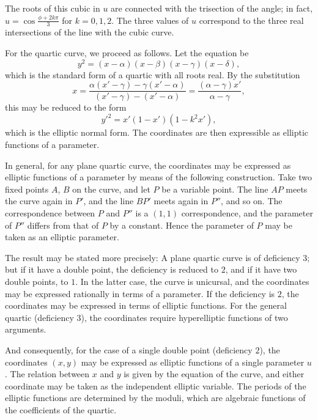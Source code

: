 \documentclass[11pt,a4paper]{book}
\begin{document}
\begin{art}
The roots of this cubic in $u$ are connected with the trisection of the angle; in fact, $u = \cos\frac{\phi + 2k\pi}{3}$ for $k = 0, 1, 2$. The three values of $u$ correspond to the three real intersections of the line with the cubic curve.
\end{art}

\begin{art}
For the quartic curve, we proceed as follows. Let the equation be
\[
y^2 = (x - \alpha)(x - \beta)(x - \gamma)(x - \delta),
\]
which is the standard form of a quartic with all roots real. By the substitution
\[
x = \frac{\alpha(x' - \gamma) - \gamma(x' - \alpha)}{(x' - \gamma) - (x' - \alpha)}
= \frac{(\alpha - \gamma)x'}{\alpha - \gamma},
\]
this may be reduced to the form
\[
y'^2 = x'(1 - x')(1 - k^2x'),
\]
which is the elliptic normal form. The coordinates are then expressible as elliptic functions of a parameter.
\end{art}

\begin{art}
In general, for any plane quartic curve, the coordinates may be expressed as elliptic functions of a parameter by means of the following construction. Take two fixed points $A$, $B$ on the curve, and let $P$ be a variable point. The line $AP$ meets the curve again in $P'$, and the line $BP'$ meets again in $P''$, and so on. The correspondence between $P$ and $P''$ is a $(1,1)$ correspondence, and the parameter of $P''$ differs from that of $P$ by a constant. Hence the parameter of $P$ may be taken as an elliptic parameter.
\end{art}

\begin{art}
The result may be stated more precisely: A plane quartic curve is of deficiency $3$; but if it have a double point, the deficiency is reduced to $2$, and if it have two double points, to $1$. In the latter case, the curve is unicursal, and the coordinates may be expressed rationally in terms of a parameter. If the deficiency is $2$, the coordinates may be expressed in terms of elliptic functions. For the general quartic (deficiency $3$), the coordinates require hyperelliptic functions of two arguments.
\end{art}

\begin{art}
And consequently, for the case of a single double point (deficiency $2$), the coordinates $(x, y)$ may be expressed as elliptic functions of a single parameter $u$. The relation between $x$ and $y$ is given by the equation of the curve, and either coordinate may be taken as the independent elliptic variable. The periods of the elliptic functions are determined by the moduli, which are algebraic functions of the coefficients of the quartic.
\end{art}
\end{document}
